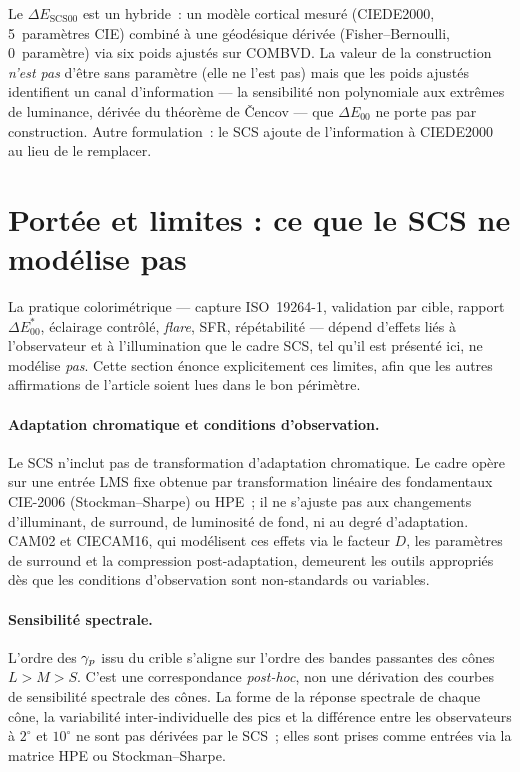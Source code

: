 \documentclass[12pt,a4paper]{article}
\begin{document}
Le $\Delta E_{\mathrm{SCS00}}$ est un hybride~: un mod\`ele cortical
mesur\'e (CIEDE2000, 5~param\`etres CIE) combin\'e \`a une
g\'eod\'esique d\'eriv\'ee (Fisher--Bernoulli, 0~param\`etre) via six
poids ajust\'es sur COMBVD. La valeur de la construction \emph{n'est
pas} d'\^etre sans param\`etre (elle ne l'est pas) mais que les poids
ajust\'es identifient un canal d'information --- la sensibilit\'e non
polynomiale aux extr\^emes de luminance, d\'eriv\'ee du th\'eor\`eme
de \v{C}encov --- que $\Delta E_{00}$ ne porte pas par construction.
Autre formulation~: le SCS ajoute de l'information \`a CIEDE2000 au
lieu de le remplacer.

\section{Port\'ee et limites : ce que le SCS ne mod\'elise pas}
\label{sec:scope_limits}

La pratique colorim\'etrique --- capture ISO~19264-1, validation par
cible, rapport $\Delta E^*_{00}$, \'eclairage contr\^ol\'e,
\emph{flare}, SFR, r\'ep\'etabilit\'e --- d\'epend d'effets li\'es \`a
l'observateur et \`a l'illumination que le cadre SCS, tel qu'il est
pr\'esent\'e ici, ne mod\'elise \emph{pas}. Cette section \'enonce
explicitement ces limites, afin que les autres affirmations de
l'article soient lues dans le bon p\'erim\`etre.

\paragraph{Adaptation chromatique et conditions d'observation.}
Le SCS n'inclut pas de transformation d'adaptation chromatique. Le
cadre op\`ere sur une entr\'ee LMS fixe obtenue par transformation
lin\'eaire des fondamentaux CIE-2006 (Stockman--Sharpe) ou HPE~; il
ne s'ajuste pas aux changements d'illuminant, de surround, de
luminosit\'e de fond, ni au degr\'e d'adaptation. CAM02 et CIECAM16,
qui mod\'elisent ces effets via le facteur $D$, les param\`etres de
surround et la compression post-adaptation, demeurent les outils
appropri\'es d\`es que les conditions d'observation sont
non-standards ou variables.

\paragraph{Sensibilit\'e spectrale.}
L'ordre des $\gamma_{p}$ issu du crible s'aligne sur l'ordre des
bandes passantes des c\^ones $L > M > S$. C'est une correspondance
\emph{post-hoc}, non une d\'erivation des courbes de sensibilit\'e
spectrale des c\^ones. La forme de la r\'eponse spectrale de chaque
c\^one, la variabilit\'e inter-individuelle des pics et la
diff\'erence entre les observateurs \`a $2^\circ$ et $10^\circ$ ne
sont pas d\'eriv\'ees par le SCS~; elles sont prises comme entr\'ees
via la matrice HPE ou Stockman--Sharpe.
\end{document}
